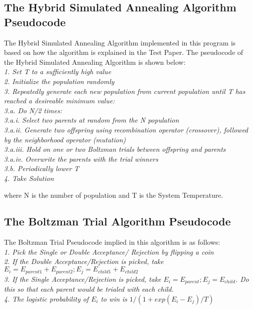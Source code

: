 \documentclass{article}
\begin{document}
\subsection{The Hybrid Simulated Annealing Algorithm Pseudocode}
The Hybrid Simulated Annealing Algorithm implemented in this program is based on how the algorithm is explained in the Test Paper. The pseudocode of the Hybrid Simulated Annealing Algorithm is shown below:\\
\textit{
1. Set T to a sufficiently high value\\
2. Initialize the population randomly\\
3. Repeatedly generate each new population from current population until T has reached a desireable minimum value:\\
	3.a. Do N/2 times:\\
		3.a.i. Select two parents at random from the N population\\
		3.a.ii. Generate two offspring using recombination operator (crossover), followed by the neighborhood operator (mutation)\\
		3.a.iii. Hold on one or two Boltzman trials between offspring and parents\\
		3.a.iv. Overwrite the parents with the trial winners\\
	3.b. Periodically lower T\\
4. Take Solution\\
}

where N is the number of population and T is the System Temperature.\\

\subsection{The Boltzman Trial Algorithm Pseudocode}
The Boltzman Trial Pseudocode implied in this algorithm is as follows:\\
\textit{
1. Pick the Single or Double Acceptance/ Rejection by flipping a coin\\
2. If the Double Acceptance/Rejection is picked, take $E_i = E_{parent1} + E_{parent2}; E_j = E_{child1} + E_{child2}$\\
3. If the Single Acceptance/Rejection is picked, take $E_i = E_{parent}; E_j = E_{child}$. Do this so that each parent would be trialed with each child.\\
4. The logistic probability of $E_i$ to win is $1/(1 + exp(E_i - E_j)/T)$\\
}
\end{document}
